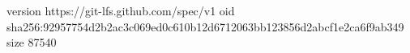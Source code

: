 version https://git-lfs.github.com/spec/v1
oid sha256:92957754d2b2ac3c069ed0c610b12d6712063bb123856d2abcf1e2ca6f9ab349
size 87540
